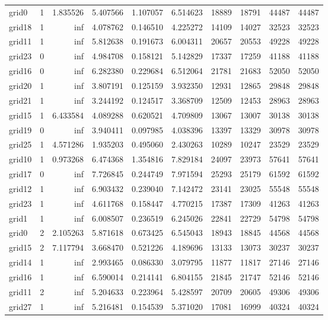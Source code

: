 \begin{longtable}{|l|r|r|r|r|r|r|r|r|r|}
grid0 & 1 & 1.835526 & 5.407566 & 1.107057 & 6.514623 & 18889 & 18791 & 44487 & 44487 \\
grid18 & 1 & inf & 4.078762 & 0.146510 & 4.225272 & 14109 & 14027 & 32523 & 32523 \\
grid11 & 1 & inf & 5.812638 & 0.191673 & 6.004311 & 20657 & 20553 & 49228 & 49228 \\
grid23 & 0 & inf & 4.984708 & 0.158121 & 5.142829 & 17337 & 17259 & 41188 & 41188 \\
grid16 & 0 & inf & 6.282380 & 0.229684 & 6.512064 & 21781 & 21683 & 52050 & 52050 \\
grid20 & 1 & inf & 3.807191 & 0.125159 & 3.932350 & 12931 & 12865 & 29848 & 29848 \\
grid21 & 1 & inf & 3.244192 & 0.124517 & 3.368709 & 12509 & 12453 & 28963 & 28963 \\
grid15 & 1 & 6.433584 & 4.089288 & 0.620521 & 4.709809 & 13067 & 13007 & 30138 & 30138 \\
grid19 & 0 & inf & 3.940411 & 0.097985 & 4.038396 & 13397 & 13329 & 30978 & 30978 \\
grid25 & 1 & 4.571286 & 1.935203 & 0.495060 & 2.430263 & 10289 & 10247 & 23529 & 23529 \\
grid10 & 1 & 0.973268 & 6.474368 & 1.354816 & 7.829184 & 24097 & 23973 & 57641 & 57641 \\
grid17 & 0 & inf & 7.726845 & 0.244749 & 7.971594 & 25293 & 25179 & 61592 & 61592 \\
grid12 & 1 & inf & 6.903432 & 0.239040 & 7.142472 & 23141 & 23025 & 55548 & 55548 \\
grid23 & 1 & inf & 4.611768 & 0.158447 & 4.770215 & 17387 & 17309 & 41263 & 41263 \\
grid1 & 1 & inf & 6.008507 & 0.236519 & 6.245026 & 22841 & 22729 & 54798 & 54798 \\
grid0 & 2 & 2.105263 & 5.871618 & 0.673425 & 6.545043 & 18943 & 18845 & 44568 & 44568 \\
grid15 & 2 & 7.117794 & 3.668470 & 0.521226 & 4.189696 & 13133 & 13073 & 30237 & 30237 \\
grid14 & 1 & inf & 2.993465 & 0.086330 & 3.079795 & 11877 & 11817 & 27146 & 27146 \\
grid16 & 1 & inf & 6.590014 & 0.214141 & 6.804155 & 21845 & 21747 & 52146 & 52146 \\
grid11 & 2 & inf & 5.204633 & 0.223964 & 5.428597 & 20709 & 20605 & 49306 & 49306 \\
grid27 & 1 & inf & 5.216481 & 0.154539 & 5.371020 & 17081 & 16999 & 40324 & 40324 \\

\end{longtable}
